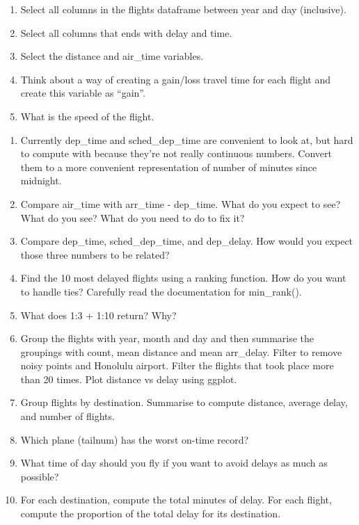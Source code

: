 \documentclass[
]{article}
\begin{document}
\begin{enumerate}
\def\labelenumi{\alph{enumi})}
\item
  Select all columns in the flights dataframe between year and day
  (inclusive).
\item
  Select all columns that ends with delay and time.
\item
  Select the distance and air\_time variables.
\item
  Think about a way of creating a gain/loss travel time for each flight
  and create this variable as ``gain''.
\item
  What is the speed of the flight.
\end{enumerate}

\begin{enumerate}
\def\labelenumi{\arabic{enumi}.}
\setcounter{enumi}{13}
\item
  Currently dep\_time and sched\_dep\_time are convenient to look at,
  but hard to compute with because they're not really continuous
  numbers. Convert them to a more convenient representation of number of
  minutes since midnight.
\item
  Compare air\_time with arr\_time - dep\_time. What do you expect to
  see? What do you see? What do you need to do to fix it?
\item
  Compare dep\_time, sched\_dep\_time, and dep\_delay. How would you
  expect those three numbers to be related?
\item
  Find the 10 most delayed flights using a ranking function. How do you
  want to handle ties? Carefully read the documentation for min\_rank().
\item
  What does 1:3 + 1:10 return? Why?
\item
  Group the flights with year, month and day and then summarise the
  groupings with count, mean distance and mean arr\_delay. Filter to
  remove noisy points and Honolulu airport. Filter the flights that took
  place more than 20 times. Plot distance vs delay using ggplot.
\item
  Group flights by destination. Summarise to compute distance, average
  delay, and number of flights.
\item
  Which plane (tailnum) has the worst on-time record?
\item
  What time of day should you fly if you want to avoid delays as much as
  possible?
\item
  For each destination, compute the total minutes of delay. For each
  flight, compute the proportion of the total delay for its destination.

\end{enumerate}
\end{document}

